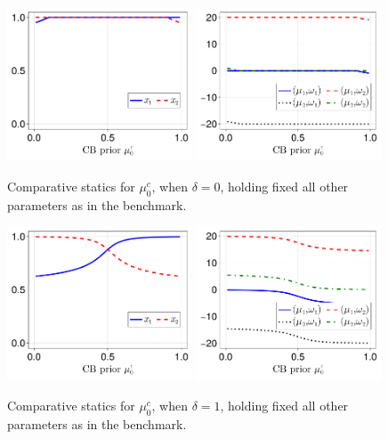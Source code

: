 \documentclass[12pt,a4paper]{article}
\begin{document}
\begin{figure}[H]
\centering
\includegraphics[width=0.49\textwidth]{figures/V8/γ_10/fig_optimal_π_across_μ_0_c_ω_1_1_ω_2_-1_δ_0.0_.pdf}
\includegraphics[width=0.49\textwidth]{figures/V8/γ_10/fig_posterior_across_μ_0_c_ω_1_1_ω_2_-1_δ_0.0_.pdf}
\caption{Comparative statics for $\mu_0^c$, when $\delta=0$, holding fixed all other parameters as in the benchmark.}
\label{FigureA3}
\end{figure}

\begin{figure}[H]
\centering
\includegraphics[width=0.49\textwidth]{figures/V8/γ_10/fig_optimal_π_across_μ_0_c_ω_1_1_ω_2_-1_δ_1.0_.pdf}
\includegraphics[width=0.49\textwidth]{figures/V8/γ_10/fig_posterior_across_μ_0_c_ω_1_1_ω_2_-1_δ_1.0_.pdf}
\caption{Comparative statics for $\mu_0^c$, when $\delta=1$, holding fixed all other parameters as in the benchmark.}
\label{FigureA4}
\end{figure}
\end{document}
